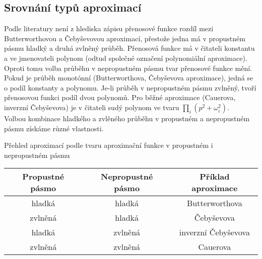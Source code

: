 \subsection{Srovnání typů aproximací}
Podle literatury \cite{10} není z hlediska zápisu přenosové funkce rozdíl mezi Butterworthovou a Čebyševovou aproximací, přestože jedna má v propustném pásmu hladký a druhá zvlněný průběh. Přenosová funkce má v čitateli konstantu a ve jmenovateli polynom (odtud společné označení polynomiální aproximace).\\
Oproti tomu volba průběhu v nepropustném pásmu tvar přenosové funkce mění. Pokud je průběh monotónní (Butterworthova, Čebyševova aproximace), jedná se o podíl konstanty a polynomu. Je-li průběh v nepropustném pásmu zvlněný, tvoří přenosovou funkci podíl dvou polynomů. Pro běžné aproximace (Cauerova, inverzní Čebyševova) je v čitateli sudý polynom ve tvaru $\prod _{i} (p^2 + \omega_i^2)$.\\
Volbou kombinace hladkého a zvlěného průběhu v propustném a nepropustném pásmu získáme různé vlastnosti.\\
 \begin{table}[h]
 \caption[Přehled aproximací podle tvaru aproximační funkce v propustném i nepropustném pásmu]{\label{tab:Přehled aproximací podle tvaru aproximační funkce v propustném i nepropustném pásmu}Přehled aproximací podle tvaru aproximační funkce v propustném i nepropustném pásmu \cite{10}}
  \end{table}
\begin{center}
\begin{table}[h]
\centering
  \begin{tabular}{ | c | c | c | }
    \hline
    Propustné pásmo & Nepropustné pásmo & Příklad aproximace \\ \hline
    hladká & hladká & Butterworthova \\ \hline
    zvlněná & hladká & Čebyševova \\ \hline
    hladká & zvlněná & inverzní Čebyševova \\ \hline
    zvlněná & zvlněná & Cauerova \\ \hline
  \end{tabular}
   \end{table}
   \end{center}